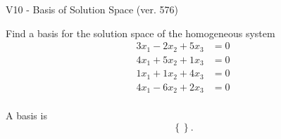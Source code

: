 \begin{exercise}
  \begin{exerciseTitle}V10 - Basis of Solution Space (ver. 576)\end{exerciseTitle}
  \begin{exerciseStatement}
    Find a basis for the solution space of the homogeneous system 
\begin{align*}
 3 x_ 1 -2 x_ 2 + 5 x_ 3 &= 0  \\ 
  4 x_ 1 + 5 x_ 2 + 1 x_ 3 &= 0  \\ 
  1 x_ 1 + 1 x_ 2 + 4 x_ 3 &= 0  \\ 
  4 x_ 1 -6 x_ 2 + 2 x_ 3 &= 0  \\ 
 \end{align*}


 
  \end{exerciseStatement}

  \begin{exerciseAnswer}
   A basis is   
\[\left\{\right\}.\]

  


  \end{exerciseAnswer}
\end{exercise}